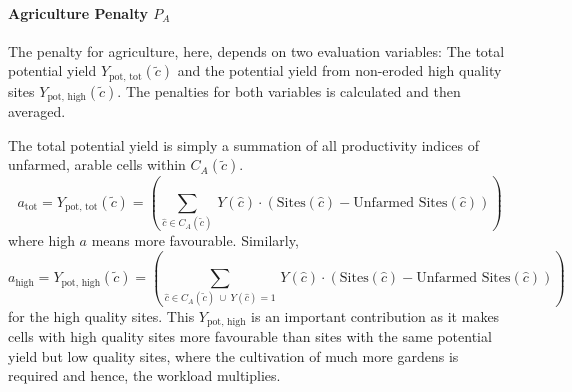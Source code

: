 



\paragraph{Agriculture Penalty $P_A$}
The penalty for agriculture, here, depends on two evaluation variables: 
The total potential yield $Y_\text{pot, tot}(\tilde{c})$ and the potential yield from non-eroded high quality sites $Y_\text{pot, high}(\tilde{c})$.
The penalties for both variables is calculated and then averaged.

The total potential yield is simply a summation of all productivity indices of unfarmed, arable cells within $C_A(\tilde{c})$.
\begin{equation}
	a_\text{tot} = Y_\text{pot, tot}(\tilde{c}) = \left( \sum_{\hat{c} \in C_A(\tilde{c}) }\, Y(\hat{c}) \cdot (\text{Sites}(\hat{c})  - \text{Unfarmed Sites}(\hat{c}) )\right)
\end{equation}
where high $a$ means more favourable.
Similarly, 
\begin{equation}
	a_\text{high} = Y_\text{pot, high}(\tilde{c}) = \left( \sum_{\hat{c} \in C_A(\tilde{c}) \ \cup \ Y(\hat{c})=1} \, Y(\hat{c}) \cdot (\text{Sites}(\hat{c})  - \text{Unfarmed Sites}(\hat{c}) )\right)
\end{equation}
for the high quality sites. 
This $Y_\text{pot, high}$ is an important contribution as it makes cells with high quality sites more favourable than sites with the same potential yield but low quality sites, where the cultivation of much more gardens is required and hence, the workload multiplies.

